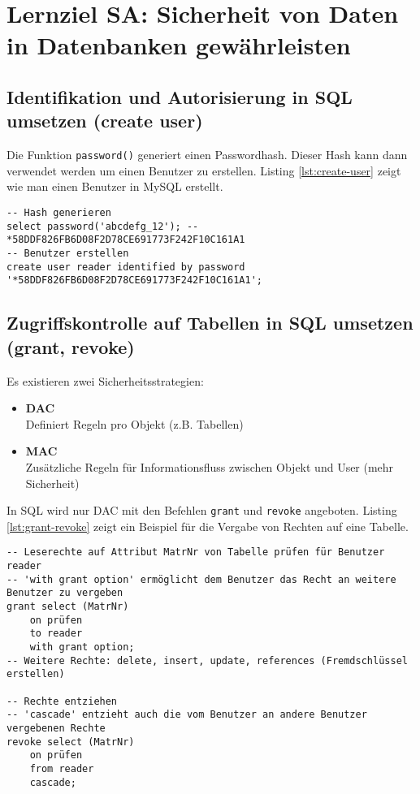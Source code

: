 \section{Lernziel SA: Sicherheit von Daten in Datenbanken gewährleisten}

\subsection{Identifikation und Autorisierung in SQL umsetzen (create user)}

Die Funktion \texttt{password()} generiert einen Passwordhash. Dieser Hash kann dann verwendet werden um einen Benutzer zu erstellen. Listing \ref{lst:create-user} zeigt wie man einen Benutzer in MySQL erstellt.

\begin{lstlisting}[caption={Benutzer erstellen},label=lst:create-user]
-- Hash generieren
select password('abcdefg_12'); -- *58DDF826FB6D08F2D78CE691773F242F10C161A1
-- Benutzer erstellen
create user reader identified by password '*58DDF826FB6D08F2D78CE691773F242F10C161A1';
\end{lstlisting}

\subsection{Zugriffskontrolle auf Tabellen in SQL umsetzen (grant, revoke)}

Es existieren zwei Sicherheitsstrategien:

\begin{itemize}
	\item \textbf{\ac{DAC}} \\
		  Definiert Regeln pro Objekt (z.B. Tabellen)
	\item \textbf{\ac{MAC}} \\
		  Zusätzliche Regeln für Informationsfluss zwischen Objekt und User (mehr Sicherheit)
\end{itemize}

In SQL wird nur \ac{DAC} mit den Befehlen \texttt{grant} und \texttt{revoke} angeboten. Listing \ref{lst:grant-revoke} zeigt ein Beispiel für die Vergabe von Rechten auf eine Tabelle.

\begin{lstlisting}[caption={Rechte auf Tabelle},label=lst:grant-revoke]
-- Leserechte auf Attribut MatrNr von Tabelle prüfen für Benutzer reader
-- 'with grant option' ermöglicht dem Benutzer das Recht an weitere Benutzer zu vergeben
grant select (MatrNr)
	on prüfen
	to reader
	with grant option;
-- Weitere Rechte: delete, insert, update, references (Fremdschlüssel erstellen)

-- Rechte entziehen
-- 'cascade' entzieht auch die vom Benutzer an andere Benutzer vergebenen Rechte
revoke select (MatrNr)
	on prüfen
	from reader
	cascade;
\end{lstlisting}

